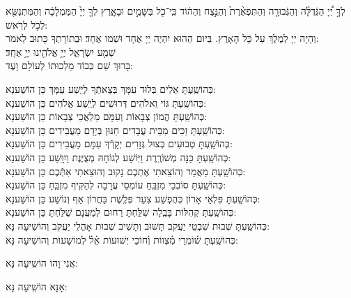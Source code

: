 \documentclass[twoside, openany, parskip=half, 11pt]{book}
\begin{document}
 לְךָ֣ יְ֠יָ הַגְּֿדֻלָּ֨ה וְהַגְּֿבוּרָ֤ה וְהַתִּפְאֶ֨רֶת֙ וְהַנֵּ֣צַח וְהַה֔וֹד 
	כִּֽי־כֹ֖ל בַּשָּׁמַ֣יִם וּבָאָ֑רֶץ	לְךָ֤ יְיָ֙ הַמַּמְלָכָ֔ה 
וְהַמִּתְנַשֵּׂ֖א לְכֹ֥ל לְרֹֽאשׁ:\\
 וְהָיָה יְיָ לְמֶלֶךְ עַל כָּל הָאָרֶץ. בַּיּום הַהוּא יִהְיֶה יְיָ אֶחָד וּשְׁמו אֶחָד׃ וּבְתוֹרָתְךָ כָּתוּב לֵאמֹר: \\
 שְׁמַ֖ע יִשְׂרָאֵ֑ל יְיָ֥ אֱלֹהֵ֖ינוּ יְיָ֥ אֶחָֽד׃\\
  בָּרוּךְ שֵׁם כְּבוֹד מַלְכוּתוֹ לְעוֹלָם וָעֶד:

\begin{small}
כְּהוֹשַֽׁעְתָּ אֵלִים בְּלוּד עִמָּךְ בְּצֵאתְֿךָ לְיֵֽשַׁע עַמָּךְ 		\hfill		כֵּן הוֹשַׁענָא: \\
כְּהוֹשַֽׁעְתָּ גּוֹי וֵאלֹהִים דְּרוּשִׁים לְיֵֽשַׁע אֱלֹהִים 			\hfill		כֵּן הוֹשַׁענָא: \\
כְּהוֹשַֽׁעְתָּ הֲמוֹן צְבָאוֹת וְעִמָּם מַלְאֲכֵי צְבָאוֹת 		\hfill		כֵּן הוֹשַׁענָא: \\
כְּהוֹשַֽׁעְתָּ זַכִּים מִבֵּית עֲבָדִים חַנּוּן בְּיָדָם מַעֲבִידִים 		\hfill		כֵּן הוֹשַׁענָא: \\
כְּהוֹשַֽׁעְתָּ טְבוּעִים בְּצוּל גְּזָרִים יְקָרְֿךָ עִמָּם מַעֲבִירִים 		\hfill		כֵּן הוֹשַׁענָא: \\
כְּהוֹשַֽׁעְתָּ כַּנָּה מְשׁוֹרֶֽרֶת וַיּֽוֹשַׁע לְגוֹחָהּ מְצֻיֶּנֶת וַיִוָּֽשַׁע 		\hfill		כֵּן הוֹשַׁענָא: \\
כְּהוֹשַֽׁעְתָּ מַאֲמַר וְהוֹצֵאתִי אֶתְכֶם נָקוּב וְהוּצֵאתִי אִתְּֿכֶם 	\hfill		כֵּן הוֹשַׁענָא:\\
כְּהוֹשַֽׁעְתָּ סוֹבְבֵי מִזְבֵּֽחַ עוֹמְסֵי עֲרָבָה לְהַקִּיף מִזְבֵּֽחַ 		\hfill		כֵּן הוֹשַׁענָא: \\
כְּהוֹשַֽׁעְתָּ פִּלְאֵי אָרוֹן כְּהֻפְשַׁע צִעֵר פְּלֶֽשֶׁת בַּחֲרוֹן אַף וְנוֹשַׁע 	\hfill		כֵּן הוֹשַׁענָא: \\
כְּהוֹשַֽׁעְתָּ קְהִלּוֹת בָּבֶֽלָה שִׁלַּֽחְתָּ רַחוּם לְמַעֲנָם שֻׁלַּחְתָּ 		\hfill		כֵּן הוֹשַׁענָא:\\
כְּהוֹשַֽׁעְתָּ שְׁבוּת שִׁבְטֵי יַעֲקֹב תָּשׁוּב וְתָשִׁיב שְׁבוּת אָהֳלֵי יַעֲקֹב \hfill		וְהוֹשִׁיעָה נָּא:\\
 כְּהוֹשַֽׁעְתָּ שׁ֗וֹמְרֵי מִ֗צְווֹת וְ֗חוֹכֵי יְשׁוּעוֹת אֵ֗ל֗ לְמוֹשָׁעוֹת 		\hfill	וְהוֹשִׁיעָה נָּא:

\end{small}

\begin{large}
\chazzan
אֲנִי וָהוֹ הוֹשִֽיעָה נָּא:

\shatzvkahal
 אָנָּא הוֹשִֽׁיעָה נָּא:

\end{large}
\end{document}
